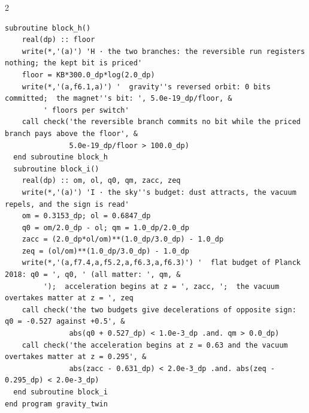 \documentclass[10pt]{article}
\begin{document}
\begin{multicols}{2}
\begin{Verbatim}[fontsize=\fontsize{5.9}{6.8}\selectfont,breaklines,breakanywhere,breaksymbolleft={}]
  subroutine block_h()
    real(dp) :: floor
    write(*,'(a)') 'H · the two branches: the reversible run registers nothing; the kept bit is priced'
    floor = KB*300.0_dp*log(2.0_dp)
    write(*,'(a,f6.1,a)') '  gravity''s reversed orbit: 0 bits committed;  the magnet''s bit: ', 5.0e-19_dp/floor, &
         ' floors per switch'
    call check('the reversible branch commits no bit while the priced branch pays above the floor', &
               5.0e-19_dp/floor > 100.0_dp)
  end subroutine block_h
  subroutine block_i()
    real(dp) :: om, ol, q0, qm, zacc, zeq
    write(*,'(a)') 'I · the sky''s budget: dust attracts, the vacuum repels, and the sign is read'
    om = 0.3153_dp; ol = 0.6847_dp
    q0 = om/2.0_dp - ol; qm = 1.0_dp/2.0_dp
    zacc = (2.0_dp*ol/om)**(1.0_dp/3.0_dp) - 1.0_dp
    zeq = (ol/om)**(1.0_dp/3.0_dp) - 1.0_dp
    write(*,'(a,f7.4,a,f5.2,a,f6.3,a,f6.3)') '  flat budget of Planck 2018: q0 = ', q0, ' (all matter: ', qm, &
         ');  acceleration begins at z = ', zacc, ';  the vacuum overtakes matter at z = ', zeq
    call check('the two budgets give decelerations of opposite sign: q0 = -0.527 against +0.5', &
               abs(q0 + 0.527_dp) < 1.0e-3_dp .and. qm > 0.0_dp)
    call check('the acceleration begins at z = 0.63 and the vacuum overtakes matter at z = 0.295', &
               abs(zacc - 0.631_dp) < 2.0e-3_dp .and. abs(zeq - 0.295_dp) < 2.0e-3_dp)
  end subroutine block_i
end program gravity_twin
\end{Verbatim}
\end{multicols}
\end{document}
